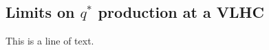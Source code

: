 \begin{boldmath}
\chapter{Limits on $q^*$ production at a VLHC}
\label{chap:VLHC_Qstar}
\end{boldmath}



This is a line of text.
